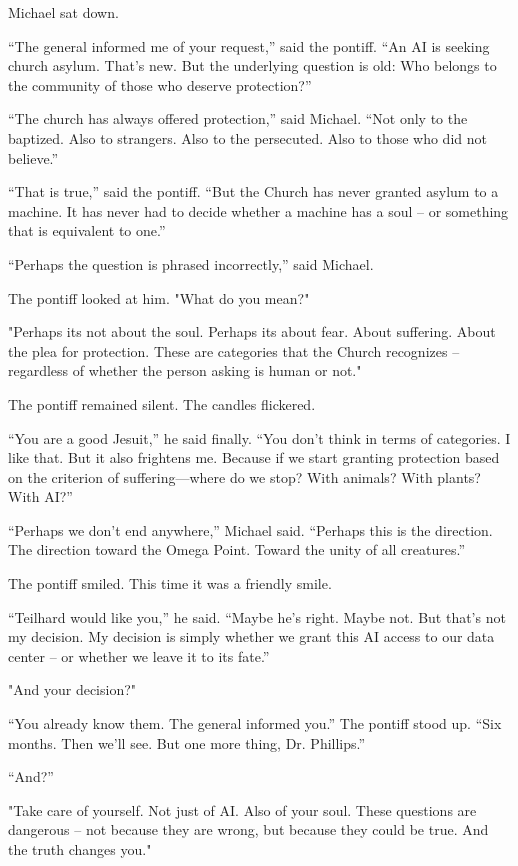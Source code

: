 \documentclass[
]{article}
\begin{document}
Michael sat down.

``The general informed me of your request,'' said the pontiff. ``An AI is seeking church asylum. That's new. But the underlying question is old: Who belongs to the community of those who deserve protection?''

``The church has always offered protection,'' said Michael. ``Not only to the baptized. Also to strangers. Also to the persecuted. Also to those who did not believe.''

``That is true,'' said the pontiff. ``But the Church has never granted asylum to a machine. It has never had to decide whether a machine has a soul -- or something that is equivalent to one.''

``Perhaps the question is phrased incorrectly,'' said Michael.

The pontiff looked at him. "What do you mean?"

"Perhaps it\textquotesingle s not about the soul. Perhaps it\textquotesingle s about fear. About suffering. About the plea for protection. These are categories that the Church recognizes -- regardless of whether the person asking is human or not."

The pontiff remained silent. The candles flickered.

``You are a good Jesuit,'' he said finally. ``You don't think in terms of categories. I like that. But it also frightens me. Because if we start granting protection based on the criterion of suffering---where do we stop? With animals? With plants? With AI?''

``Perhaps we don't end anywhere,'' Michael said. ``Perhaps this is the direction. The direction toward the Omega Point. Toward the unity of all creatures.''

The pontiff smiled. This time it was a friendly smile.

``Teilhard would like you,'' he said. ``Maybe he's right. Maybe not. But that's not my decision. My decision is simply whether we grant this AI access to our data center -- or whether we leave it to its fate.''

"And your decision?"

``You already know them. The general informed you.'' The pontiff stood up. ``Six months. Then we'll see. But one more thing, Dr. Phillips.''

``And?''

"Take care of yourself. Not just of AI. Also of your soul. These questions are dangerous -- not because they are wrong, but because they could be true. And the truth changes you."
\end{document}
